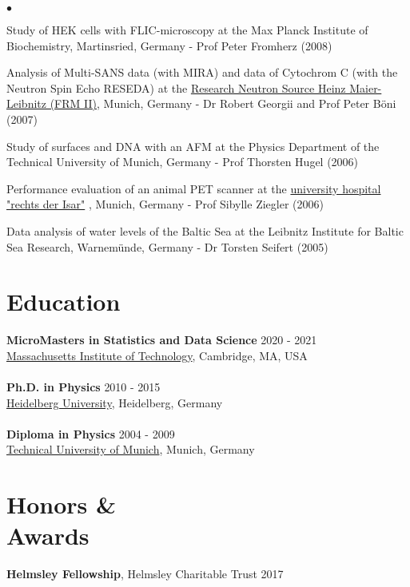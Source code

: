 \documentclass[margin,line]{res}
\newenvironment{list2}{
  \begin{list}{$\bullet$}{%
      \setlength{\itemsep}{0in}
      \setlength{\parsep}{0in} \setlength{\parskip}{0in}
      \setlength{\topsep}{0in} \setlength{\partopsep}{0in} 
      \setlength{\leftmargin}{0.2in}}}{\end{list}}
\begin{document}
\begin{resume}
\begin{list2}
\item Study of HEK cells with FLIC-microscopy at the Max Planck Institute of Biochemistry, Martinsried, Germany - Prof Peter Fromherz (2008)
\item Analysis of Multi-SANS data (with MIRA) and data of Cytochrom C (with the Neutron Spin Echo RESEDA) at the  \href{https://www.frm2.tum.de/en/home/}{Research Neutron Source Heinz Maier-Leibnitz (FRM II)}, Munich, Germany - Dr Robert Georgii and Prof Peter Böni (2007)
\item Study of surfaces and DNA with an AFM at the Physics Department of the Technical University of Munich, Germany - Prof Thorsten Hugel (2006)
\item Performance evaluation of an animal PET scanner at the  \href{https://www.mri.tum.de/}{university hospital "rechts der Isar"} , Munich, Germany - Prof Sibylle Ziegler (2006)
\item Data analysis of water levels of the Baltic Sea at the Leibnitz Institute for Baltic Sea Research, Warnemünde, Germany - Dr Torsten Seifert (2005)
\end{list2}


\section{\sc Education}
{\bf MicroMasters in Statistics and Data Science} \hfill {2020 - 2021}\\
\href{https://micromasters.mit.edu/ds/}{Massachusetts Institute of Technology}, Cambridge, MA, USA\\
\vspace*{-3mm}\\
{\bf Ph.D. in Physics} \hfill {2010 - 2015}\\
\href{https://www.uni-heidelberg.de/en}{Heidelberg University}, Heidelberg, Germany\\
\vspace*{-3mm}\\
{\bf Diploma in Physics} \hfill {2004 - 2009}\\
\href{https://www.tum.de/en/}{Technical University of Munich}, Munich, Germany


\section{\sc Honors \& \\Awards} 
{\bf Helmsley Fellowship}, Helmsley Charitable Trust  \hfill 2017


\end{resume}
\end{document}
